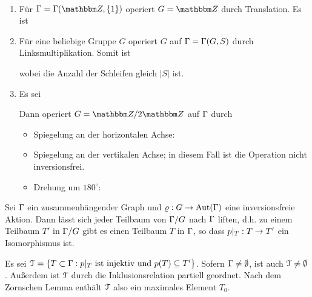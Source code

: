 \BSP\
\begin{enumerate}
\item Für $\GR=\GR(\ZZ,\{1\})$ operiert $G=\ZZ$ durch
Translation. Es ist
\begin{center}
\end{center}
\item Für eine beliebige Gruppe $G$ operiert $G$ auf
$\Gamma=\Gamma(G,S)$ durch Linksmultiplikation.
Somit ist
\begin{center}
\end{center}
wobei die Anzahl der Schleifen gleich $|S|$ ist.
\item Es sei
\begin{center}
\end{center}
Dann operiert $G=\ZZ/2\ZZ$ auf $\Gamma$ durch
\begin{itemize}
\item Spiegelung an der horizontalen Achse:
\begin{center}
\end{center}
\item Spiegelung an der vertikalen Achse; in diesem Fall ist
die Operation nicht inversionsfrei.
\item
Drehung um $180^\circ$:
\begin{center}
\end{center}
\end{itemize}
\end{enumerate}

\BEM Sei $\Gamma$ ein zusammenhängender Graph und $\varrho:G\rightarrow\mathrm{Aut}(\Gamma)$
eine inversionsfreie Aktion.
Dann lässt sich jeder Teilbaum von $\Gamma/G$ nach $\Gamma$ liften,
d.h. zu einem Teilbaum $T'$ in $\Gamma/G$ gibt es einen Teilbaum $T$ in
$\Gamma$, so dass $p|_T:T\rightarrow T'$ ein Isomorphismus ist.

\bew Es sei
$\mathcal{T} =\{ T \subset \Gamma : p|_T \text{ ist injektiv und } p(T)\subseteq T' \}$.
Sofern $\Gamma\neq\emptyset$, ist auch $\mathcal{T}\neq\emptyset$.
Außerdem ist $\mathcal{T}$ durch die Inklusionsrelation partiell geordnet.
Nach dem Zornschen Lemma enthält $\mathcal{T}$ also ein maximales Element
$T_0$.

